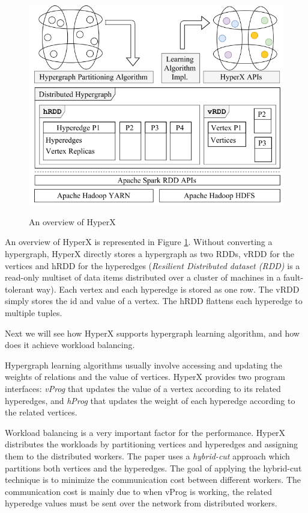 \documentclass[paper=a4, fontsize=18pt]{article} %
\numberwithin{equation}{section} %
\numberwithin{figure}{section} %
\numberwithin{table}{section} %
\begin{document}
\begin{figure}[h]
  \centering
  \includegraphics[width=.7\linewidth]{8_15_HyperX2.png}\\
  \caption{An overview of HyperX}\label{fig:HyperX2}
\end{figure}

An overview of HyperX is represented in Figure \ref{fig:HyperX2}. Without converting a hypergraph, HyperX directly stores a hypergraph as two RDDs, vRDD for the vertices and hRDD for the hyperedges (\emph{Resilient Distributed dataset (RDD)} is a read-only multiset of data items distributed over a cluster of machines in a fault-tolerant way). Each vertex and each hyperedge is stored as one row. The vRDD simply stores the id and value of a vertex. The hRDD flattens each hyperedge to multiple tuples.

Next we will see how HyperX supports hypergraph learning algorithm, and how does it achieve workload balancing.

Hypergraph learning algorithms usually involve accessing and updating the weights of relations and the value of vertices. HyperX provides two program interfaces: \emph{vProg} that updates the value of a vertex according to its related hyperedges, and \emph{hProg} that updates the weight of each hyperedge according to the related vertices.

Workload balancing is a very important factor for the performance. HyperX distributes the workloads by partitioning vertices and hyperedges and assigning them to the distributed workers. The paper uses a \emph{hybrid-cut} approach which partitions both vertices and the hyperedges. The goal of applying the hybrid-cut technique is to minimize  the communication cost between different workers. The communication cost is mainly due to when vProg is working, the related hyperedge values must be sent over the network from distributed workers.
\end{document}
